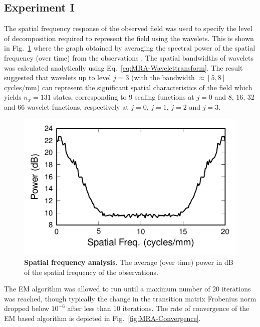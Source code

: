 \documentclass[review,authoryear,3p]{elsarticle}
\begin{document}
\subsection{Experiment I}
The spatial frequency response of the observed field was used to specify the level of decomposition required to represent the field using the wavelets. This is shown in Fig.~\ref{fig:ObservationFrequencyResponce} where the graph obtained by averaging the spectral power of the spatial frequency (over time) from the observations \citep{Scerri2009}. The spatial bandwidths of wavelets was calculated analytically using  Eq.~\eqref{eq:MRA-Wavelettransform}. The result suggested that wavelets up to level $j=3$ (with the bandwidth $\approx[5,8]$ cycles/mm) can represent the significant spatial characteristics of the field which yields $n_x = 131$ states, corresponding to 9 scaling functions at $j=0$ and 8, 16, 32 and 66 wavelet functions, respectively at $j=0$, $j=1$, $j=2$ and $j=3$. 
\begin{figure}[!t]
 	\centering
 		\includegraphics[scale=1]{./Graph/fig7.pdf}
 		\caption{{\bf Spatial frequency analysis}. The average (over time) power in dB of the spatial frequency of the observations.}  
\label{fig:ObservationFrequencyResponce} 
 \end{figure}
The EM algorithm was allowed to run until a maximum number of 20 iterations was reached, though typically the change in the transition matrix Frobenius norm dropped below $10^{-6}$ after less than 10 iterations. The rate of convergence of the EM based algorithm is depicted in Fig.~\ref{fig:MRA-Convergence}. 
\end{document}

